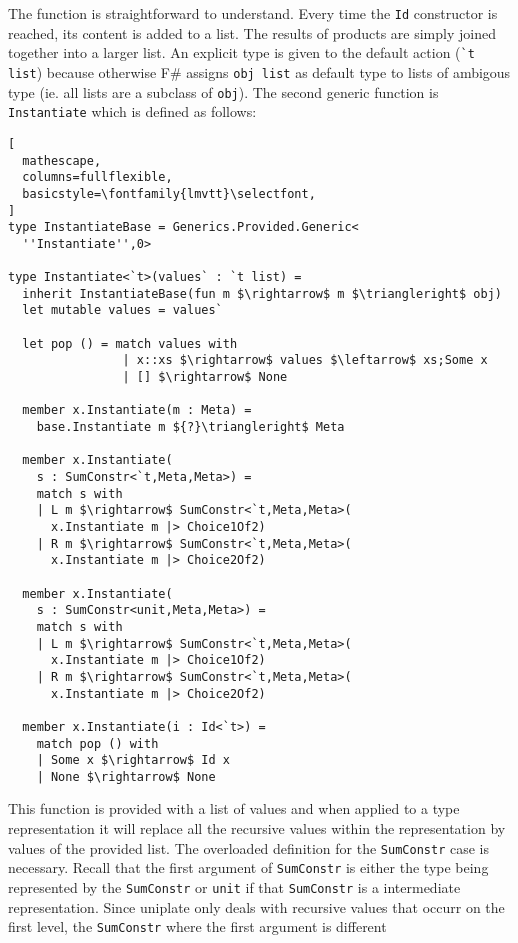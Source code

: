\documentclass{sigplanconf}
\begin{document}
The function is straightforward to understand. Every time
the \verb+Id+ constructor is reached, its content is added
to a list. The results of products are simply joined
together into a larger list. An explicit type is given
to the default action (\verb+`t list+) because otherwise
F\# assigns \verb+obj list+ as default type to lists of
ambigous type (ie. all lists are a subclass of \verb+obj+).
The second generic function is \verb+Instantiate+ which is
defined as follows:
\begin{lstlisting}[
  mathescape,
  columns=fullflexible,
  basicstyle=\fontfamily{lmvtt}\selectfont,
]
type InstantiateBase = Generics.Provided.Generic<
  ''Instantiate'',0>

type Instantiate<`t>(values` : `t list) =
  inherit InstantiateBase(fun m $\rightarrow$ m $\triangleright$ obj)
  let mutable values = values`

  let pop () = match values with
                | x::xs $\rightarrow$ values $\leftarrow$ xs;Some x
                | [] $\rightarrow$ None

  member x.Instantiate(m : Meta) =
    base.Instantiate m ${?}\triangleright$ Meta

  member x.Instantiate(
    s : SumConstr<`t,Meta,Meta>) =
    match s with
    | L m $\rightarrow$ SumConstr<`t,Meta,Meta>(
      x.Instantiate m |> Choice1Of2)
    | R m $\rightarrow$ SumConstr<`t,Meta,Meta>(
      x.Instantiate m |> Choice2Of2)

  member x.Instantiate(
    s : SumConstr<unit,Meta,Meta>) =
    match s with
    | L m $\rightarrow$ SumConstr<`t,Meta,Meta>(
      x.Instantiate m |> Choice1Of2)
    | R m $\rightarrow$ SumConstr<`t,Meta,Meta>(
      x.Instantiate m |> Choice2Of2)

  member x.Instantiate(i : Id<`t>) =
    match pop () with
    | Some x $\rightarrow$ Id x
    | None $\rightarrow$ None

\end{lstlisting}
This function is provided with a list of values and
when applied to a type representation it will replace
all the recursive values within the representation
by values of the provided list. The overloaded
definition for the \verb+SumConstr+ case is necessary.
Recall that the first argument of \verb+SumConstr+ is either
the type being represented by the \verb+SumConstr+ or
\verb+unit+ if that \verb+SumConstr+ is a intermediate
representation. Since uniplate only deals with
recursive values that occurr on the first level,
the \verb+SumConstr+ where the first argument is different
\end{document}
